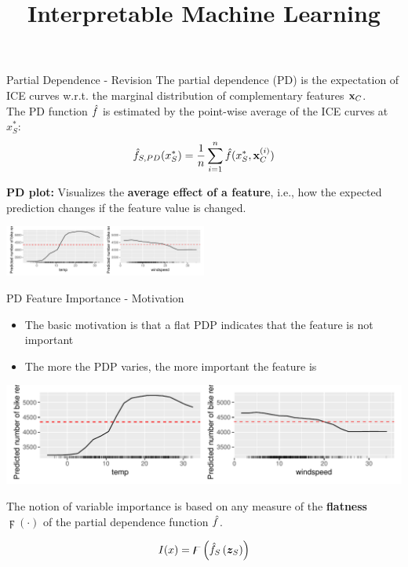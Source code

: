 \documentclass[11pt,compress,t,notes=noshow, aspectratio=169, xcolor=table]{beamer}
\title{Interpretable Machine Learning}
\date{}
\begin{document}
\newcommand{\titlefigure}{figure_man/pdps_bike}
\newcommand{\learninggoals}{
\item Introduction to PDP feature importance
\item Numerical and Categorical Measures of flatness
}


\begin{frame}{Partial Dependence - Revision}
The partial dependence (PD) is the expectation of ICE curves w.r.t. the marginal distribution of complementary features $\xv_C$.\\
The PD function $\fh$ is estimated by the point-wise average of the ICE curves at $x_S^*$:
$$\fh_{S, PD}(x_S^*) = \frac{1}{n} \sum_{i=1}^n \fh(x_S^*, \xv_C^{(i)})$$



\textbf{PD plot:} Visualizes the \textbf{average effect of a feature},
  i.e., how the expected prediction changes if the feature value is changed.
\begin{center}
\includegraphics[width=0.5\textwidth]{figure_man/pdps_bike}
\end{center}
\end{frame}

\begin{frame}{PD Feature Importance - Motivation}
\begin{itemize}
    \item The basic motivation is that a flat PDP indicates that the feature is not important
    \item The more the PDP varies, the more important the feature is
\end{itemize}

\begin{center}
\includegraphics[width=1\textwidth]{figure_man/pdps_bike}
\end{center}

The notion of variable importance is based on any measure of the \textbf{flatness} $\digamma(\cdot)$ of the partial dependence function $\fh$.

$$
I(x)=\digamma\left(\fh_{S}\left(\boldsymbol{z}_{S}\right)\right)
$$

\end{frame}
\end{document}
